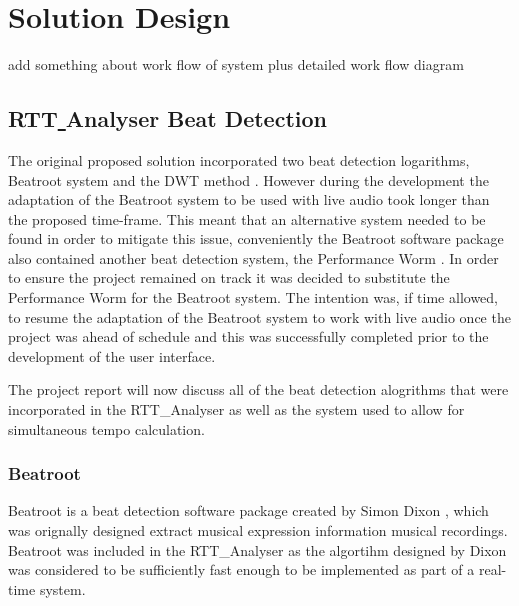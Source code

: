 \documentclass[a4paper, 11pt]{article}
\begin{document}
\maketitle{} \section{Solution Design}
add something about work flow of system plus detailed work flow diagram

\subsection{RTT\underline{{ }}Analyser Beat Detection}
The original proposed solution incorporated two beat detection logarithms, Beatroot system \cite{dixon1} and the DWT method \cite{tzane1}. However during the development the adaptation of the Beatroot system to be used with live audio took longer than the proposed time-frame. This meant that an alternative system needed to be found in order to mitigate this issue, conveniently the Beatroot software package also contained another beat detection system, the Performance Worm \cite{dixon3}. In order to ensure the project remained on track it was decided to substitute the Performance Worm for the Beatroot system. The intention was, if time allowed, to resume the adaptation of the Beatroot system to work with live audio once the project was ahead of schedule and this was successfully completed prior to the development of the user interface.

The project report will now discuss all of the beat detection alogrithms that were incorporated in the RTT\_Analyser as well as the system used to allow for simultaneous tempo calculation.  

\subsubsection{Beatroot}
Beatroot is a beat detection software package created by Simon Dixon \cite{dixon1}, which was orignally designed extract musical expression information musical recordings\cite{dixon3}. Beatroot was included in the RTT{\_}Analyser as the algortihm designed by Dixon was considered to be sufficiently fast enough to be implemented as part of a real-time system\cite{dixon4}.\par
\end{document}
